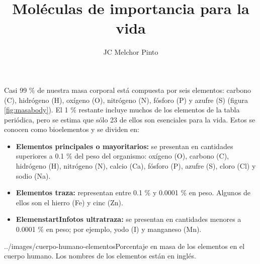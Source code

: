 \documentclass[12pt,addpoints,answers]{guia}
\title{Moléculas de importancia para la vida  }
\author{JC Melchor Pinto}
\begin{document}
\pagestyle{headandfoot}

\INFO
\printanswers
\begin{startInfo}
    {
        Casi 99 \% de nuestra masa corporal está compuesta por seis elementos:
        carbono (C), hidrógeno (H), oxígeno (O), nitrógeno (N), fósforo
        (P) y azufre (S) (figura \ref{fig:masabody}). El 1  \% restante incluye muchos
        de los elementos de la tabla periódica, pero se estima que
        sólo 23 de ellos son esenciales para la vida. Estos se conocen
        como bioelementos y se dividen en:
        \begin{itemize}
            \item \textbf{Elementos principales o mayoritarios:} se presentan en cantidades superiores a 0.1 \% del peso del organismo: oxígeno (O),
                  carbono (C), hidrógeno (H), nitrógeno (N), calcio (Ca), fósforo
                  (P), azufre (S), cloro (Cl) y sodio (Na).
            \item \textbf{Elementos traza:} representan entre 0.1 \% y 0.0001 \% en peso.
                  Algunos de ellos son el hierro (Fe) y cinc (Zn).
            \item \textbf{ElemenstartInfotos ultratraza:} se presentan en cantidades menores a
                  0.0001 \% en peso; por ejemplo, yodo (I) y manganeso (Mn).
        \end{itemize}
    }{../images/cuerpo-humano-elementos}{Porcentaje en masa de los elementos
        en el cuerpo humano. Los nombres de los elementos están en inglés.}
\end{startInfo}
\end{document}
